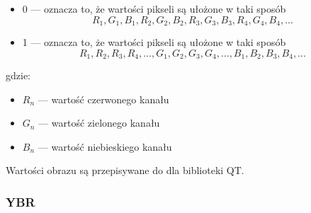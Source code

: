 \begin{itemize}
    \item 0 --- oznacza to, że wartości pikseli są ułożone w taki sposób
        \[R_1, G_1, B_1, R_2, G_2, B_2, R_3, G_3, B_3, R_4, G_4, B_4,  ...\]
    \item 1 --- oznacza to, że wartości pikseli są ułożone w taki sposób
        \[R_1, R_2, R_3, R_4, ... , G_1, G_2, G_3, G_4, ..., B_1, B_2, B_3, B_4, ...\]
\end{itemize}
gdzie:
\begin{itemize}
    \item $R_n$ --- wartość czerwonego kanału
    \item $G_n$ --- wartość zielonego kanału
    \item $B_n$ --- wartość niebieskiego kanału
\end{itemize}

Wartości obrazu są przepisywane do  dla biblioteki QT.

\subsubsection{YBR}

